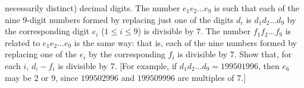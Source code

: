 necessarily distinct) decimal digits. The number $e_{1}e_{2}\dots
e_{9}$ is such that each of the nine 9-digit numbers formed by
replacing just one of the digits $d_{i}$ is $d_{1}d_{2}\dots d_{9}$
by the corresponding digit $e_{i}$ ($1 \leq i \leq 9$) is divisible
by 7. The number $f_{1}f_{2}\dots f_{9}$ is related to
$e_{1}e_{2}\dots e_{9}$ is the same way: that is, each of the nine
numbers formed by replacing one of the $e_{i}$ by the corresponding
$f_{i}$ is divisible by 7. Show that, for each $i$, $d_{i}-f_{i}$ is
divisible by 7. [For example, if $d_{1}d_{2}\dots d_{9} = 199501996$,
then $e_{6}$ may be 2 or 9, since $199502996$ and $199509996$ are
multiples of 7.]
